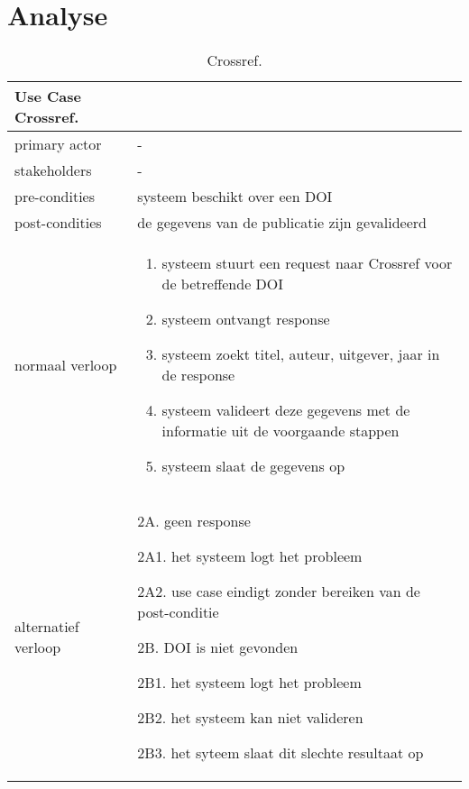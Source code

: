 \section{Analyse}
\begin{table}[ptb]
    \centering
    \begin{tabular}{ | m{5cm} | m{10cm}| } 
        \hline
        \rowcolor{lightgray}
        Use Case Crossref. \\ 
        \hline
        primary actor & - \\ 
        \hline
        stakeholders & - \\ 
        \hline
        pre-condities & systeem beschikt over een DOI \\ 
        \hline
        post-condities & de gegevens van de publicatie zijn gevalideerd \\ 
        \hline
        normaal verloop & 
        \begin{enumerate}
            \item systeem stuurt een request naar Crossref voor de betreffende DOI
            \item systeem ontvangt response
            \item systeem zoekt titel, auteur, uitgever, jaar in de response
            \item systeem valideert deze gegevens met de informatie uit de voorgaande stappen
            \item systeem slaat de gegevens op
        \end{enumerate} \\ 
        \hline
        alternatief verloop & 
        \begin{description}
            \item 2A. geen response
            \item 2A1. het systeem logt het probleem
            \item 2A2. use case eindigt zonder bereiken van de post-conditie
            \item 2B. DOI is niet gevonden
            \item 2B1. het systeem logt het probleem
            \item 2B2. het systeem kan niet valideren
            \item 2B3. het syteem slaat dit slechte resultaat op
        \end{description} \\ 
        \hline
    \end{tabular}
    \caption{Crossref.}
\end{table}
